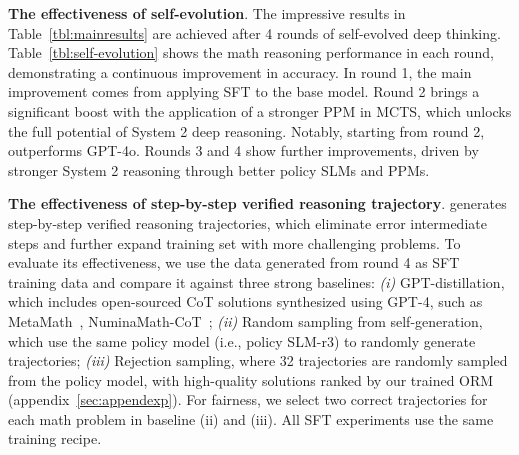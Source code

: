 \begin{table}[hpt]
	\small 
	\centering
	\caption{The continuously improved math reasoning capabilities through {\sysname} self-evolved deep thinking. Starting from round 2, the 7B base model  powered by {\sysname} surpasses GPT-4o. }
	\label{tbl:self-evolution}
\end{table}


\noindent\textbf{The effectiveness of self-evolution}.  The impressive results in Table~\ref{tbl:mainresults} are achieved after 4 rounds of {\sysname} self-evolved deep thinking. Table~\ref{tbl:self-evolution} shows the math reasoning performance in each round, demonstrating a continuous improvement in  accuracy. 
 In round 1, the main improvement comes from applying SFT to the base model. Round 2 brings a significant boost with the application of a stronger PPM in MCTS, which unlocks the full potential of System 2 deep reasoning. Notably, starting from round 2,  {\sysname} outperforms GPT-4o. Rounds 3 and 4 show further improvements, driven by stronger System 2 reasoning through better policy SLMs and PPMs. 


\noindent\textbf{The effectiveness of step-by-step verified reasoning trajectory}.  {\sysname} generates step-by-step verified reasoning trajectories,  which eliminate error intermediate steps and further expand training set with more  challenging problems. To evaluate its effectiveness, we use the data generated from round 4  as SFT training data and compare it against 
 three strong baselines: \textit{(i)} GPT-distillation, which includes open-sourced CoT solutions synthesized using GPT-4, such as MetaMath~\citep{yu2023metamath}, NuminaMath-CoT~\citep{numinamathcot}; \textit{(ii)} Random sampling from self-generation, 
 which use the same policy model (i.e., policy SLM-r3) to randomly generate trajectories; \textit{(iii)} Rejection sampling, where 32 trajectories are randomly sampled from the policy model, with high-quality solutions ranked by our trained ORM (appendix~\ref{sec:appendexp}). For fairness, we select two correct trajectories for each math problem in baseline (ii) and (iii). All SFT experiments use the same training recipe.
 
